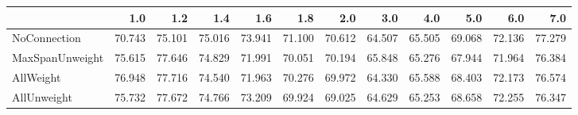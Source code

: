 \begin{tabular}{lrrrrrrrrrrr}
\toprule
{} &    1.0 &    1.2 &    1.4 &    1.6 &    1.8 &    2.0 &    3.0 &    4.0 &    5.0 &    6.0 &    7.0 \\
\midrule
NoConnection    & 70.743 & 75.101 & 75.016 & 73.941 & 71.100 & 70.612 & 64.507 & 65.505 & 69.068 & 72.136 & 77.279 \\
MaxSpanUnweight & 75.615 & 77.646 & 74.829 & 71.991 & 70.051 & 70.194 & 65.848 & 65.276 & 67.944 & 71.964 & 76.384 \\
AllWeight       & 76.948 & 77.716 & 74.540 & 71.963 & 70.276 & 69.972 & 64.330 & 65.588 & 68.403 & 72.173 & 76.574 \\
AllUnweight     & 75.732 & 77.672 & 74.766 & 73.209 & 69.924 & 69.025 & 64.629 & 65.253 & 68.658 & 72.255 & 76.347 \\
\bottomrule
\end{tabular}
